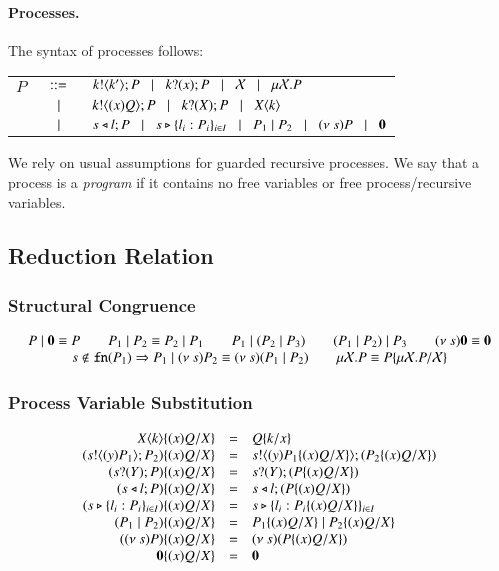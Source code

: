 \paragraph{Processes.}

The syntax of processes follows:

\begin{tabular}{rcl}
	$P$	&$\;\;::=\;\;$&	$k ! \langle k' \rangle ; P \;\;\;|\;\;\; k ? (x) ; P \;\;\;|\;\;\; \mathcal{X} \;\;\;|\;\;\; \mu \mathcal{X}. P$\\
		&$\;\;\;|\;\;\;$&	$k ! \langle (x)Q \rangle ; P \;\;\;|\;\;\; k ? (X) ; P \;\;\;|\;\;\; X\langle k \rangle$\\ 
		&$\;\;\;|\;\;\;$&	$s \triangleleft l ; P \;\;\;|\;\;\; s \triangleright \{l_i:P_i\}_{i \in I} \;\;\;|\;\;\; 
				P_1 \;|\; P_2 \;\;\;|\;\;\; (\nu\ s) P \;\;\;|\;\;\; \mathbf{0}$
\end{tabular}

We rely on usual assumptions for guarded recursive processes.
We say that a process is a \emph{program} if it contains
no free variables or free process/recursive variables.

\subsection{Reduction Relation}

\subsubsection{Structural Congruence}
\[
	\begin{array}{c}
		P \;|\; \mathbf{0} \equiv P \qquad P_1 \;|\; P_2 \equiv P_2 \;|\; P_1 \qquad P_1 \;|\; (P_2 \;|\; P_3)
		\qquad (P_1 \;|\; P_2) \;|\; P_3 \qquad (\nu\ s) \mathbf{0} \equiv \mathbf{0}\\
		s \notin \mathtt{fn}(P_1) \Rightarrow P_1 \;|\; (\nu\ s) P_2 \equiv (\nu\ s)(P_1 \;|\; P_2)
		\qquad \mu \mathcal{X}. P \equiv P\{\mu \mathcal{X}. P/\mathcal{X} \}
	\end{array}
\]

\subsubsection{Process Variable Substitution}
\[
	\begin{array}{rclcrcl}
			X\langle k \rangle \{(x)Q/X \} & = & Q \{k/x \} \\
		(s ! \langle (y)P_1 \rangle ; P_2) \{(x)Q/X \} &=& s ! \langle (y)P_1 \{(x)Q/X \} \rangle ; (P_2 \{(x)Q/X \}) \\
		(s ? (Y) ; P) \{(x)Q/X \} &=& s ? (Y) ; (P \{(x)Q/X \}) \\
		(s \triangleleft l ; P) \{(x)Q/X \} &=& s \triangleleft l ; (P \{(x)Q/X \})\\
		(s \triangleright \{l_i : P_i\}_{i \in I}) \{(x)Q/X \} &=& s \triangleright \{l_i : P_i \{(x)Q/X \}\}_{i \in I}\\
		(P_1 \;|\; P_2) \{(x)Q/X \} & = & P_1 \{(x)Q/X \} \;|\; P_2 \{(x)Q/X \}\\
		((\nu\ s) P) \{(x)Q/X \} & = & (\nu\ s) (P \{(x)Q/X \})\\
		\mathbf{0} \{(x)Q/X \} & = & \mathbf{0}
	\end{array}
\]

